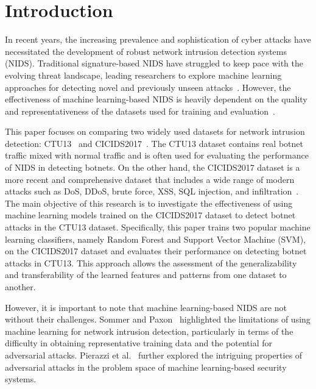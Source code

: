 \chapter{Introduction}

In recent years, the increasing prevalence and sophistication of cyber attacks have necessitated the development of robust network intrusion detection systems (NIDS). Traditional signature-based NIDS have struggled to keep pace with the evolving threat landscape, leading researchers to explore machine learning approaches for detecting novel and previously unseen attacks~\cite{marchetti2016analysis}. However, the effectiveness of machine learning-based NIDS is heavily dependent on the quality and representativeness of the datasets used for training and evaluation~\cite{engelen2021troubleshooting}.

This paper focuses on comparing two widely used datasets for network intrusion detection: CTU13~\cite{garcia2014empirical} and CICIDS2017~\cite{sharafaldin2018toward}. The CTU13 dataset contains real botnet traffic mixed with normal traffic and is often used for evaluating the performance of NIDS in detecting botnets. On the other hand, the CICIDS2017 dataset is a more recent and comprehensive dataset that includes a wide range of modern attacks such as DoS, DDoS, brute force, XSS, SQL injection, and infiltration~\cite{sharafaldin2018toward}. The main objective of this research is to investigate the effectiveness of using machine learning models trained on the CICIDS2017 dataset to detect botnet attacks in the CTU13 dataset. Specifically, this paper trains two popular machine learning classifiers, namely Random Forest and Support Vector Machine (SVM), on the CICIDS2017 dataset and evaluates their performance on detecting botnet attacks in CTU13. This approach allows the assessment of the generalizability and transferability of the learned features and patterns from one dataset to another.

However, it is important to note that machine learning-based NIDS are not without their challenges. Sommer and Paxon~\cite{sommer2010outside} highlighted the limitations of using machine learning for network intrusion detection, particularly in terms of the difficulty in obtaining representative training data and the potential for adversarial attacks. Pierazzi et al.~\cite{pierazzi2020intriguing} further explored the intriguing properties of adversarial attacks in the problem space of machine learning-based security systems.

